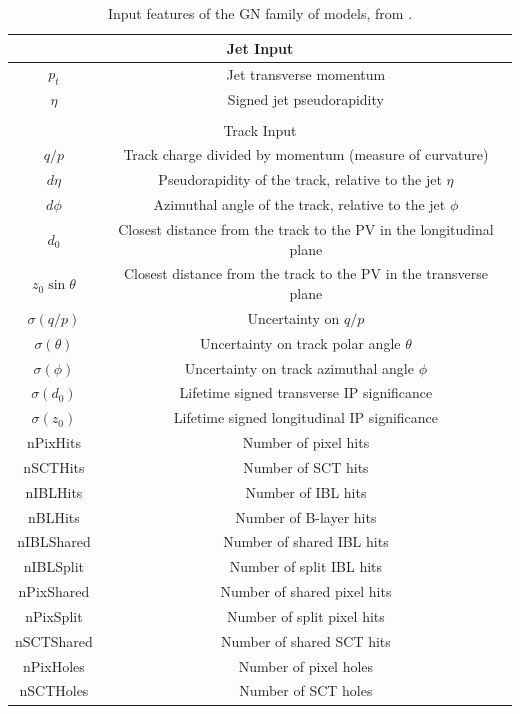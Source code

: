 \begin{table}[h]
  \begin{center}
      \begin{tabular}{cc} 
      	 \hline \hline
          \multicolumn{2}{c}{Jet Input}\\ \hline
          $p_t$   & Jet transverse momentum \\ 
          $\eta$  & Signed jet pseudorapidity \\ \hline \hline
          \multicolumn{2}{c}{ }\\ 
          \multicolumn{2}{c}{Track Input}\\ \hline
          $q/p$             & Track charge divided by momentum (measure of curvature)  \\
          $d\eta$           & Pseudorapidity of the track, relative to the jet $\eta$ \\
          $d\phi$           & Azimuthal angle of the track, relative to the jet $\phi$ \\
          $d_0$             & Closest distance from the track to the PV in the longitudinal plane  \\
          $z_0 \sin\theta$  & Closest distance from the track to the PV in the transverse plane  \\
          $\sigma(q/p)$     & Uncertainty on $q/p$ \\
          $\sigma(\theta)$  & Uncertainty on track polar angle $\theta$ \\
          $\sigma(\phi)$    & Uncertainty on track azimuthal angle $\phi$ \\
          $\sigma(d_0)$     & Lifetime signed transverse IP significance \\
          $\sigma(z_0)$     & Lifetime signed longitudinal IP significance \\
          nPixHits          & Number of pixel hits \\
          nSCTHits          & Number of SCT hits \\
          nIBLHits          & Number of IBL hits \\
          nBLHits           & Number of B-layer hits \\
          nIBLShared        & Number of shared IBL hits \\
          nIBLSplit         & Number of split IBL hits \\
          nPixShared        & Number of shared pixel hits \\
          nPixSplit         & Number of split pixel hits \\
          nSCTShared        & Number of shared SCT hits \\
          nPixHoles         & Number of pixel holes \\
          nSCTHoles         & Number of SCT holes \\ \hline \hline
      \end{tabular}
    \caption{Input features of the GN family of models, from \cite{ATL-PHYS-PUB-2022-027}.}
    \label{tab:gnInputVariables}
  \end{center}
\end{table}


